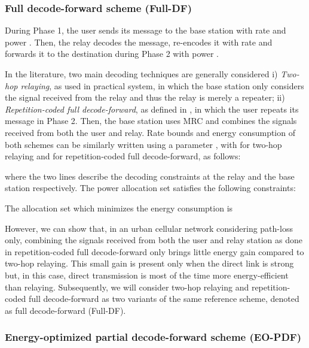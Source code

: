 \documentclass[journal]{IEEEtran}
\theoremstyle{definition}
\begin{document}
\subsubsection{Full decode-forward scheme (Full-DF)}
\label{sec:two-hop}

During Phase 1, the user sends its message to the base station with rate  and power . Then, the relay decodes the message, re-encodes it with rate  and forwards it to the destination during Phase 2 with power .

In the literature, two main decoding techniques are generally considered
i) \textit{Two-hop relaying}, as used in practical system, in which the base station only considers the signal received from the relay and thus the relay is merely a repeater;
ii) \textit{Repetition-coded full decode-forward}, as defined in \cite{laneman2004}, in which the user repeats its message in Phase 2. Then, the base station uses MRC and combines the signals received from both the user and relay.
Rate bounds and energy consumption of both schemes can be similarly written using a parameter , with  for two-hop relaying and  for repetition-coded full decode-forward, as follows: 

where the two lines describe the decoding constraints at the relay and the base station respectively. The power allocation set  satisfies the following constraints:

The allocation set which minimizes the energy consumption is  \vspace*{-12pt}


However, we can show that, in an urban cellular network considering path-loss only, combining the signals received from both the user and relay station as done in repetition-coded full decode-forward only brings little energy gain compared to two-hop relaying. 
This small gain is present only when the direct link is strong but, in this case, direct transmission is most of the time more energy-efficient than relaying.
Subsequently, we will consider two-hop relaying and repetition-coded full decode-forward as two variants of the same reference scheme, denoted as full decode-forward (Full-DF).

\subsubsection{Energy-optimized partial decode-forward scheme (EO-PDF)}
\end{document}
